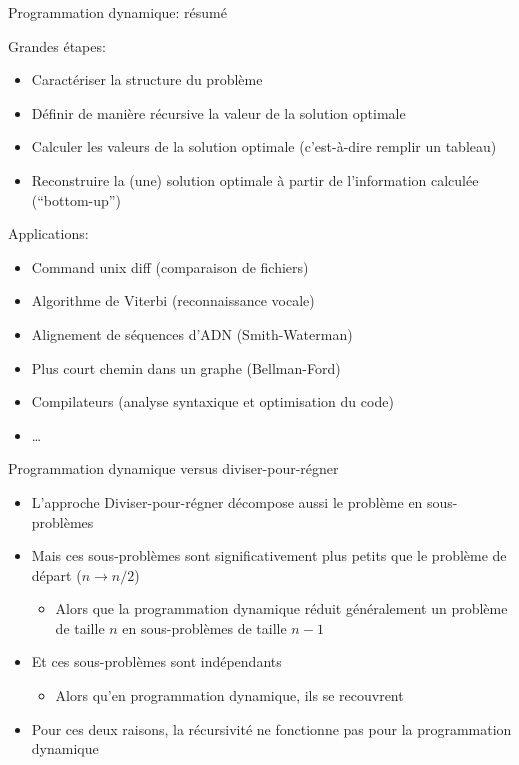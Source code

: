 \begin{frame}{Programmation dynamique: résumé}

Grandes étapes:
\begin{itemize}
\item Caractériser la structure du problème
\item Définir de manière récursive la \alert{valeur} de la solution optimale
\item Calculer les valeurs de la solution optimale (c'est-à-dire remplir un tableau)
\item Reconstruire la (une) solution optimale à partir de l'information calculée (``bottom-up'')
\end{itemize}
\bigskip

Applications:
\begin{itemize}
\item Command unix diff (comparaison de fichiers)
\item Algorithme de Viterbi (reconnaissance vocale)
\item Alignement de séquences d'ADN (Smith-Waterman)
\item Plus court chemin dans un graphe (Bellman-Ford)
\item Compilateurs (analyse syntaxique et optimisation du code)
\item \ldots
\end{itemize}

\end{frame}

\begin{frame}{Programmation dynamique versus diviser-pour-régner}
\begin{itemize}
\item L'approche Diviser-pour-régner décompose aussi le problème en sous-problèmes
\item Mais ces sous-problèmes sont significativement plus petits que le problème de départ ($n \rightarrow n/2$)
\begin{itemize}
\item Alors que la programmation dynamique réduit généralement un problème de taille $n$ en sous-problèmes de taille $n-1$
\end{itemize}
\item Et ces sous-problèmes sont indépendants
\begin{itemize}
\item Alors qu'en programmation dynamique, ils se recouvrent
\end{itemize}
\item Pour ces deux raisons, la récursivité ne fonctionne pas pour la programmation dynamique
\end{itemize}

\end{frame}


